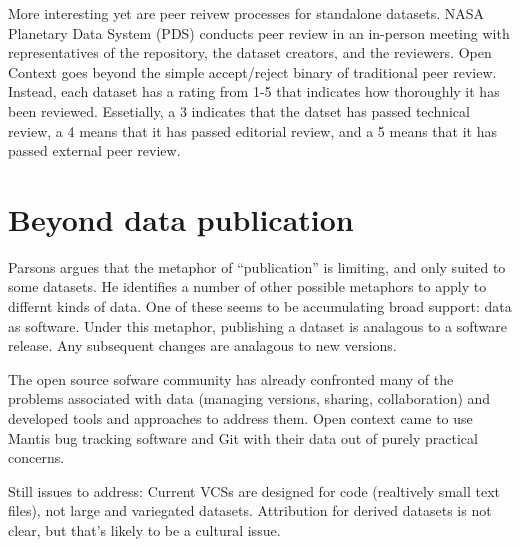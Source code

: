 \documentclass[10pt,a4paper,twocolumn]{article}
\begin{document}
More interesting yet are peer reivew processes for standalone datasets. 
NASA Planetary Data System (PDS)\cite{nasa_pds} conducts peer review in an in-person meeting with representatives of the repository, the dataset creators, and the reviewers. 
Open Context goes beyond the simple accept/reject binary of traditional peer review. 
Instead, each dataset has a rating from 1-5 that indicates how thoroughly it has been reviewed. 
Essetially, a 3 indicates that the datset has passed technical review, a 4 means that it has passed editorial review, and a 5 means that it has passed external peer review.


\section*{Beyond data publication}\label{beyond-data-publication}

Parsons\cite{parsons_is_2013} argues that the metaphor of ``publication'' is limiting, and only suited to some datasets. 
He identifies a number of other possible metaphors to apply to differnt kinds of data.
One of these seems to be accumulating broad support: data as software. 
Under this metaphor, publishing a dataset is analagous to a software release. 
Any subsequent changes are analagous to new versions.

The open source sofware community has already confronted many of the problems associated with data (managing versions, sharing, collaboration) and developed tools and approaches to address them. 
Open context came to use Mantis bug tracking software and Git with their data out of purely practical concerns.

Still issues to address: Current VCSs are designed for code (realtively small text files), not large and variegated datasets. 
Attribution for derived datasets is not clear, but that's likely to be a cultural issue.


\nocite{*}
{\small
}

\listoftodos






\end{document}
